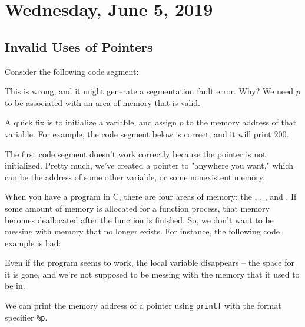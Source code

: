 \section{Wednesday, June 5, 2019}
\subsection{Invalid Uses of Pointers}

Consider the following code segment:

\lstset{
caption=Incorrect Pointer Usage
}
\begin{center}
\label{pointers:0601}
\end{center}

This is wrong, and it might generate a segmentation fault error. Why? We need $p$ to be associated with an area of memory that is valid. 

A quick fix is to initialize a variable, and assign $p$ to the memory address of that variable. For example, the code segment below is correct, and it will print $200$.

\lstset{
caption=Correct Pointer Usage
}
\begin{center}

\end{center}

The first code segment doesn't work correctly because the pointer is not initialized. Pretty much, we've created a pointer to "anywhere you want," which can be the address of some other variable, or some nonexistent memory. 


When you have a program in C, there are four areas of memory: the , , , and . If some amount of memory is allocated for a function process, that memory becomes deallocated after the function is finished. So, we don't want to be messing with memory that no longer exists. For instance, the following code example is bad:

\lstset{
caption=Incorrect Pointer Usage
}
\begin{center}

\end{center}


Even if the program seems to work, the local variable disappears -- the space for it is gone, and we're not supposed to be messing with the memory that it used to be in. 

\begin{remark}
We can print the memory address of a pointer using \verb|printf| with the format specifier \verb|%p|. 
\end{remark}

